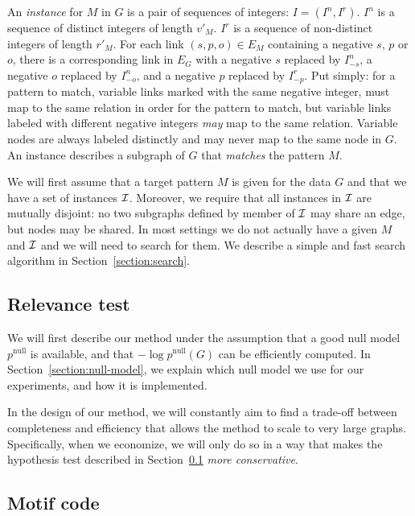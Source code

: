 \documentclass[11pt]{article}
\newcommand{\I}{{\cal I}}
\begin{document}
An \emph{instance} for $M$ in $G$ is a pair of sequences of integers: $I = (I^n, I^r)$. $I^n$ is a sequence of distinct integers of length $v'_M$. $I^r$ is a sequence of non-distinct integers of length $r'_M$. For each link $(s, p, o) \in E_M$ containing a negative $s$, $p$ or $o$, there is a corresponding link in $E_G$ with a negative $s$ replaced by $I^n_{-s}$, a negative $o$ replaced by $I^n_{-o}$, and a negative $p$ replaced by $I^r_{-p}$. Put simply: for a pattern to match, variable links marked with the same negative integer, must map to the same relation in order for the pattern to match, but variable links labeled with different negative integers \emph{may} map to the same relation. Variable nodes are always labeled distinctly and may never map to the same node in $G$. An instance describes a subgraph of $G$ that \emph{matches} the pattern $M$. 

We will first assume that a target pattern $M$ is given for the data $G$ and that we have a set of instances $\I$. Moreover, we require that all instances in $\I$ are mutually disjoint: no two subgraphs defined by member of $\I$ may share an edge, but nodes may be shared. In most settings we do not actually have a given $M$ and $\I$ and we will need to search for them. We describe a simple and fast search algorithm in Section~\ref{section:search}.

\subsection{Relevance test}

\label{section:relevance-test}

We will first describe our method under the assumption that a good null model $p^\text{null}$ is available, and that $- \log p^\text{null}(G)$ can be efficiently computed. In Section~\ref{section:null-model}, we explain which null model we use for our experiments, and how it is implemented. 

In the design of our method, we will constantly aim to find a trade-off between completeness and efficiency that allows the method to scale to very large graphs. Specifically, when we economize, we will only do so in a way that makes the hypothesis test described in Section~\ref{section:relevance-test} \emph{more conservative}.

\subsection{Motif code}
\end{document}

